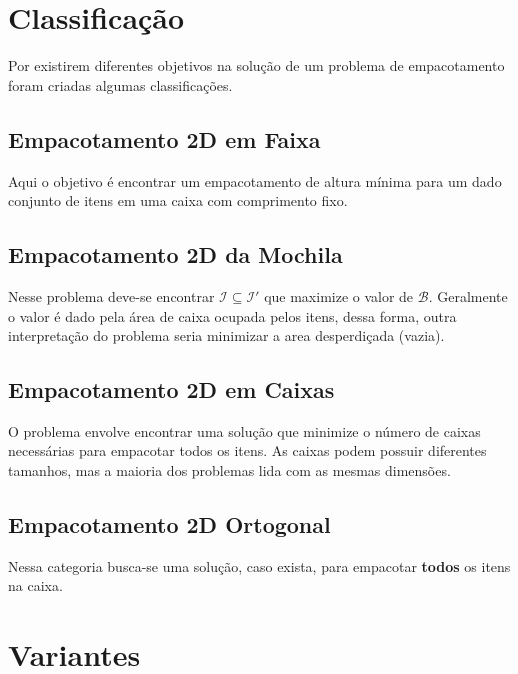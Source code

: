 \section{Classificação}\label{sec:classificacao}

Por existirem diferentes objetivos na solução de um problema de empacotamento foram criadas algumas classificações.

\subsection{Empacotamento 2D em Faixa}\label{subsec:empacotamento-2d-em-faixa}

Aqui o objetivo é encontrar um empacotamento de altura mínima para um dado conjunto de itens em uma caixa com comprimento fixo.

\subsection{Empacotamento 2D da Mochila}\label{subsec:empacotamento-2d-da-mochila}

Nesse problema deve-se encontrar $\mathcal{I} \subseteq \mathcal{I}'$ que maximize o valor de $\mathcal{B}$.
Geralmente o valor é dado pela área de caixa ocupada pelos itens, dessa forma, outra interpretação do problema seria minimizar a area desperdiçada (vazia).

\subsection{Empacotamento 2D em Caixas}\label{subsec:empacotamento-2d-em-caixas}

O problema envolve encontrar uma solução que minimize o número de caixas necessárias para empacotar todos os itens.
As caixas podem possuir diferentes tamanhos, mas a maioria dos problemas lida com as mesmas dimensões.

\subsection{Empacotamento 2D Ortogonal}\label{subsec:empacotamento-ortogonal}

Nessa categoria busca-se uma solução, caso exista, para empacotar \textbf{todos} os itens na caixa.


\section{Variantes}\label{sec:variantes}



